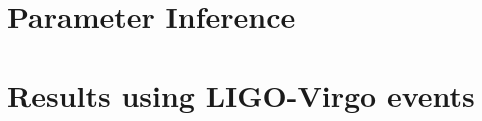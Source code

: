 \documentclass[twocolumn,
               prd,
               aps,
               superscriptaddress,
               tightenlines,
               nofootinbib,
               eqsecnum,
               amsfonts,
               amsmath,
               longbibliography]{revtex4-1}
\newcommand{\hs}[1]{{\textcolor{blue}{{[HS: #1]}} }}
\begin{document}

\section{Parameter Inference}



\section{Results using LIGO-Virgo events}
\label{sec:results}

\end{document}
